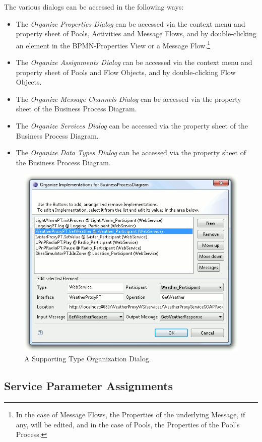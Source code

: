 The various dialogs can be accessed in the following ways:
\begin{itemize}
	\item The \emph{Organize Properties Dialog} can be accessed via the context
	menu and property sheet of Pools, Activities and Message Flows, and by
	double-clicking an element in the BPMN-Properties View or a Message
	Flow.\footnote{In the case of Message Flows, the Properties of the underlying
	Message, if any, will be edited, and in the case of Pools, the Properties of
	the Pool's Process.}

	\item The \emph{Organize Assignments Dialog} can be accessed via the context
	menu and property sheet of Pools and Flow Objects, and by double-clicking
	Flow Objects.

	\item The \emph{Organize Message Channels Dialog} can be accessed via the
	property sheet of the Business Process Diagram.

	\item The \emph{Organize Services Dialog} can be accessed via the property
	sheet of the Business Process Diagram.

	\item The \emph{Organize Data Types Dialog} can be accessed via the property
	sheet of the Business Process Diagram.
\end{itemize}

\begin{figure}[ht]
	\centering
	\includegraphics[width=.5\textwidth]{figures/features/dialog.png}
	\caption{A Supporting Type Organization Dialog.}
	\label{fig:dialog}
\end{figure}



\subsection{Service Parameter Assignments}

